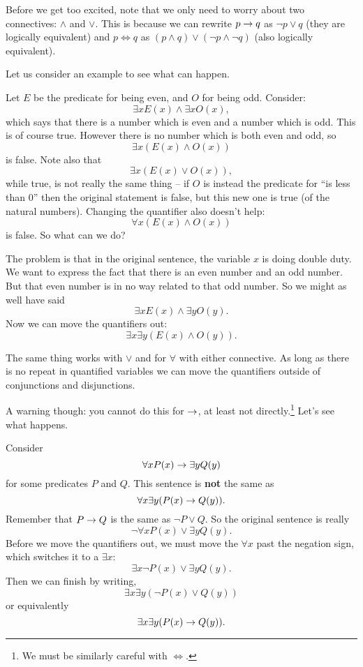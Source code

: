 \documentclass[12pt]{article}
\begin{document}
Before we get too excited, note that we only need to worry about two connectives: $\wedge$ and $\vee$.  This is because we can rewrite $p \rightarrow q$ as $\neg p \vee q$ (they are logically equivalent) and $p \iff q$ as $(p \wedge q) \vee (\neg p \wedge \neg q)$ (also logically equivalent).  

Let us consider an example to see what can happen.

\begin{example} 
  Let $E$ be the predicate for being even, and $O$ for being odd.  Consider:
\[\exists x E(x) \wedge \exists x O(x),\]
which says that there is a number which is even and a number which is odd.  This is of course true.  However there is no number which is both even and odd, so 
\[\exists x (E(x) \wedge O(x))\]
is false.  Note also that
\[\exists x (E(x) \vee O(x)),\]
while true, is not really the same thing -- if $O$ is instead the predicate for ``is less than 0'' then the original statement is false, but this new one is true (of the natural numbers).  Changing the quantifier also doesn't help:
\[\forall x (E(x) \wedge O(x))\]
is false.  So what can we do?

The problem is that in the original sentence, the variable $x$ is doing double duty.  We want to express the fact that there is an even number and an odd number.  But that even number is in no way related to that odd number.  So we might as well have said
\[ \exists x E(x) \wedge \exists y O(y).\]
Now we can move the quantifiers out:
\[\exists x \exists y (E(x) \wedge O(y)).\]
\end{example}

The same thing works with $\vee$ and for $\forall$ with either connective.  As long as there is no repeat in quantified variables we can move the quantifiers outside of conjunctions and disjunctions.  

A warning though: you cannot do this for $\rightarrow$, at least not directly.\footnote{We must be similarly careful with $\iff$.}  Let's see what happens.  

\begin{example}
Consider
\[ \forall x P(x) \rightarrow \exists y Q(y)\]
for some predicates $P$ and $Q$.  This sentence is \textbf{not} the same as
\[ \forall x \exists y (P(x) \rightarrow Q(y)).\]
Remember that $P \rightarrow Q$ is the same as $\neg P \vee Q$.  So the original sentence is really
\[\neg \forall x P(x) \vee \exists y Q(y).\]
Before we move the quantifiers out, we must move the $\forall x$ past the negation sign, which switches it to a $\exists x$:
\[\exists x \neg P(x) \vee \exists y Q(y).\]
Then we can finish by writing,
\[\exists x \exists y (\neg P(x) \vee Q(y))\]
or equivalently
\[\exists x \exists y (P(x) \rightarrow Q(y)).\]
\end{example}
\end{document}
